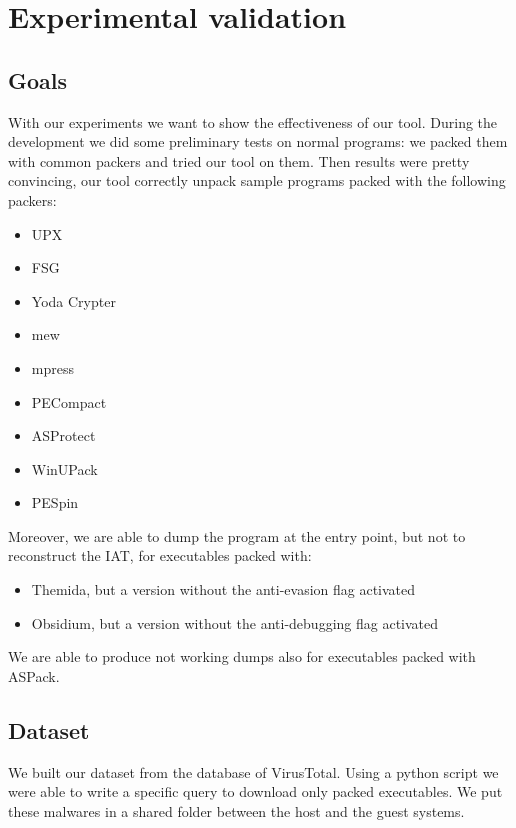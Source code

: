 \chapter{Experimental validation}
\label{chapter5}
\thispagestyle{empty}

\section{Goals}
With our experiments we want to show the effectiveness of our tool. During the development we did some preliminary tests on normal programs: we packed them with common packers and tried our tool on them. Then results were pretty convincing, our tool correctly unpack sample programs packed with the following packers:
\begin{itemize}
\item UPX
\item FSG
\item Yoda Crypter
\item mew
\item mpress
\item PECompact
\item ASProtect
\item WinUPack
\item PESpin
\end{itemize}
Moreover, we are able to dump the program at the entry point, but not to reconstruct the IAT, for executables packed with:
\begin{itemize}
\item Themida, but a version without the anti-evasion flag activated
\item Obsidium, but a version without the anti-debugging flag activated
\end{itemize}
We are able to produce not working dumps also for executables packed with ASPack.

\section{Dataset}
We built our dataset from the database of VirusTotal. Using a python script we were able to write a specific query to download only packed executables. We put these malwares in a shared folder between the host and the guest systems.

